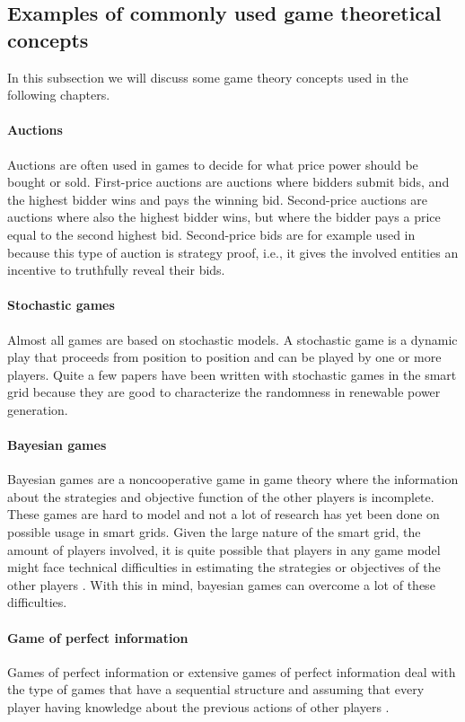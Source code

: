 \subsection{Examples of commonly used game theoretical concepts}
In this subsection we will discuss some game theory concepts used in the following chapters. 

\paragraph{Auctions}
Auctions are often used in games to decide for what price power should be bought or sold. First-price auctions are auctions where bidders submit bids, and the highest bidder wins and pays the winning bid. Second-price auctions are auctions where also the highest bidder wins, but where the bidder pays a price equal to the second highest bid. Second-price bids are for example used in \cite{SaadHanPoorEtAl2011} because this type of auction is strategy proof, i.e., it gives the involved entities an incentive to truthfully reveal their bids.
\paragraph{Stochastic games}
Almost all games are based on stochastic models. A stochastic game is a dynamic play that proceeds from position to position \cite{Shapley1953} and can be played by one or more players. Quite a few papers have been written with stochastic games in the smart grid \cite{LiangZhuang2014} because they are good to characterize the randomness in renewable power generation.  
\paragraph{Bayesian games}
Bayesian games are a noncooperative game in game theory where the information about the strategies and objective function of the other players is incomplete. These games are hard to model and not a lot of research has yet been done on possible usage in smart grids. Given the large nature of the smart grid, the amount of players involved, it is quite possible that players in any game model might face technical difficulties in estimating the strategies or objectives of the other players \cite{keypaper}. With this in mind, bayesian games can overcome a lot of these difficulties. 

\paragraph{Game of perfect information}
Games of perfect information or extensive games of perfect information deal with the type of games that have a sequential structure and assuming that every player having knowledge about the previous actions of other players \cite{CourseInGameTheory}.

